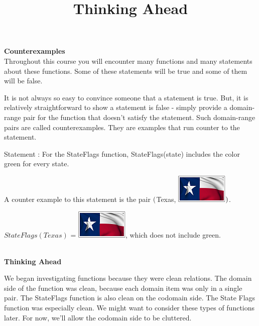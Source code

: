 \documentclass{ximera}
\title{Thinking Ahead}
\begin{document}
\begin{abstract}
\end{abstract}

\maketitle




\textbf{Counterexamples} \\

Throughout this course you will encounter many functions and many statements about these functions.  Some of these statements will be true and some of them will be false.

It is not always so easy to convince someone that a statement is true.  But, it is relatively straightforward to show a statement is false - simply provide a domain-range pair for the function that doesn't satisfy the statement. Such domain-range pairs are called counterexamples.  They are examples that run counter to the statement.
\quad \\

\begin{example}

Statement : For the StateFlags function, StateFlags(state) includes the color green for every state.

A counter example to this statement is the pair $\Large{(}$Texas, \includegraphics{pics/StateFlags/Texas.png}$\Large{)}$.

$StateFlags(Texas)$ = \includegraphics{pics/StateFlags/Texas.png}, which does not include green.
\end{example}
\quad \\


\textbf{Thinking Ahead}\ \

We began investigating functions because they were clean relations.  The domain side of the function was clean, because each domain item was only in a single pair.  The StateFlags function is also clean on the codomain side.  The State Flags function was especially clean. We might want to consider these types of functions later.  For now, we'll allow the codomain side to be cluttered.
\quad \\
\end{document}
